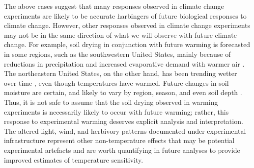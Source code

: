 \documentclass{article}
\begin{document}
\par The above cases suggest that many responses observed in climate change experiments are likely to be accurate harbingers of future biological responses to climate change. However, other responses observed in climate change experiments may not be in the same direction of what we will observe with future climate change.
For example, soil drying in conjunction with future warming is forecasted in some regions, such as the southwestern United States, mainly because of reductions in precipitation and increased evaporative demand with warmer air \citep{dai2013,seager2013}. The northeastern United States, on the other hand, has been trending wetter over time \citep{shuman2017}, even though temperatures have warmed. Future changes in soil moisture are certain, and likely to vary by region, season, and even soil depth \citep{seager2014,berg2017}. Thus, it is not safe to assume that the soil drying observed in warming experiments is necessarily likely to occur with future warming; rather, this response to experimental warming deserves explicit analysis and interpretation. The altered light, wind, and herbivory patterns documented under experimental infrastructure \citep{kennedy1995,moise2010,wolkovich2012,hoeppner2012, clark2014b} represent other non-temperature effects that may be potential experimental artefacts and are worth quantifying in future analyses to provide improved estimates of temperature sensitivity.
\end{document}

